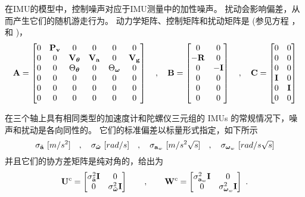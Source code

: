 在IMU的模型中，控制噪声对应于IMU测量中的加性噪声。 
扰动会影响偏差，从而产生它们的随机游走行为。 
动力学矩阵、控制矩阵和扰动矩阵是 (参见方程 ，  和 )，
%
\begin{equation}
\label{equ:IMU_ABC}
{\bf A} = \begin{bmatrix}
  0& {\bf P}_{\bf v}&  0&  0&  0&  0\\
  0&  0& {\bf V}_{\bm \theta}& {\bf V}_{\bf a}&  0& {\bf V}_{\bf g}\\
  0&  0& \Theta_{\bm \theta}&  0& \Theta_{\bm \omega}&  0\\
  0&  0&  0&  0&  0&  0\\
  0&  0&  0&  0&  0&  0\\
  0&  0&  0&  0&  0&  0
\end{bmatrix}
\quad,\quad
{\bf B} = \begin{bmatrix}
0 & 0 \\
-{\bf R} & 0 \\
0 & -{\bf I} \\
0 & 0 \\
0 & 0 \\
0 & 0 \\
\end{bmatrix}
\quad,\quad
{\bf C} = \begin{bmatrix}
0 & 0 \\
0 & 0 \\
0 & 0 \\
{\bf I} & 0 \\
0 & {\bf I} \\
0 & 0 \\
\end{bmatrix}
\end{equation}

在三个轴上具有相同类型的加速度计和陀螺仪三元组的 IMUs 的常规情况下，噪声和扰动是各向同性的。
它们的标准偏差以标量形式指定，如下所示
%
\begin{equation}
\sigma_{\tilde\bfa}\ [m/s^2] \quad,\quad \sigma_{\tilde\bfomega} \  [rad/s] \quad,\quad \sigma_{\bfa_w}\ [m/s^2\sqrt{s}] \quad,\quad \sigma_{\bfomega_w}\ [rad/s\sqrt{s}]
\end{equation}
%
并且它们的协方差矩阵是纯对角的，给出为
%
\begin{equation}
{\bf U}^c=\begin{bmatrix}
\sigma_{\tilde{{\bf a}}}^2{\bf I} & 0 \\ 0 & \sigma_{\tilde{{\bm \omega}}}^2{\bf I}  
\end{bmatrix} \qquad ,\qquad
{\bf W}^c=\begin{bmatrix}
\sigma_{{\bf a}_w}^2{\bf I} & 0 \\ 0 & \sigma_{{\bm \omega}_w}^2{\bf I}  
\end{bmatrix} ~.
\end{equation}

